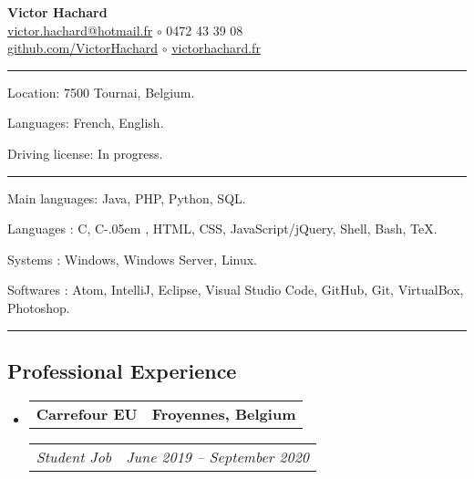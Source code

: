 \documentclass[10pt,letterpaper]{article}
\makeatletter
\newcommand{\Csharp}{%
  {\settoheight{\dimen0}{C}C\kern-.05em \resizebox{!}{\dimen0}{\raisebox{\depth}{\#}}}}
\newenvironment{indentsection}[1]
{\begin{list}{}
  {\setlength{\leftmargin}{#1}} \item[]
}
{\end{list}}
\newcommand{\headerrow}[2]
{\begin{tabular*}{\linewidth}{l@{\extracolsep{\fill}}r}
  #1 &
  #2 \\
\end{tabular*}}
\makeatother
\begin{document}
\begin{center}
  \huge \textbf{Victor Hachard} \\
  \large
  \href{mailto:victor.hachard@hotmail.fr}{victor.hachard@hotmail.fr}
  $\circ$
  0472 43 39 08
  \\
  \href{http://www.github.com/VictorHachard}{github.com/VictorHachard}
  $\circ$
  \href{http://www.victorhachard.fr}{victorhachard.fr} 
  \vspace{-0.2em}
\end{center}


\hrule
\begin{indentsection}{\parindent}
\begin{description*}
  \item[Location:] 7500 Tournai, Belgium.
  \item[Languages:] French, English.
  \item[Driving license:] In progress.
\end{description*}
\end{indentsection}


\hrule
\begin{indentsection}{\parindent}
\begin{description*}
  \item[Main languages:] Java, PHP, Python, SQL.
  \item[Languages :]  C, \Csharp, HTML, CSS,  JavaScript/jQuery, Shell,
  Bash, TeX.
  \item[Systems :] Windows, Windows Server, Linux.
  \item[Softwares :] Atom, IntelliJ, Eclipse, Visual Studio Code, GitHub, Git,
  VirtualBox, Photoshop.
\end{description*}
\end{indentsection}


\hrule
\vspace{-0.4em}
\subsection*{Professional Experience}
\begin{itemize}
  \parskip=0.1em

  \item
  \headerrow
    {\textbf{Carrefour EU}}
    {\textbf{Froyennes, Belgium}}
  \headerrow
    {\emph{Student Job}}
    {\emph{June 2019 -- September 2020}}
  \end{itemize}
\end{document}
